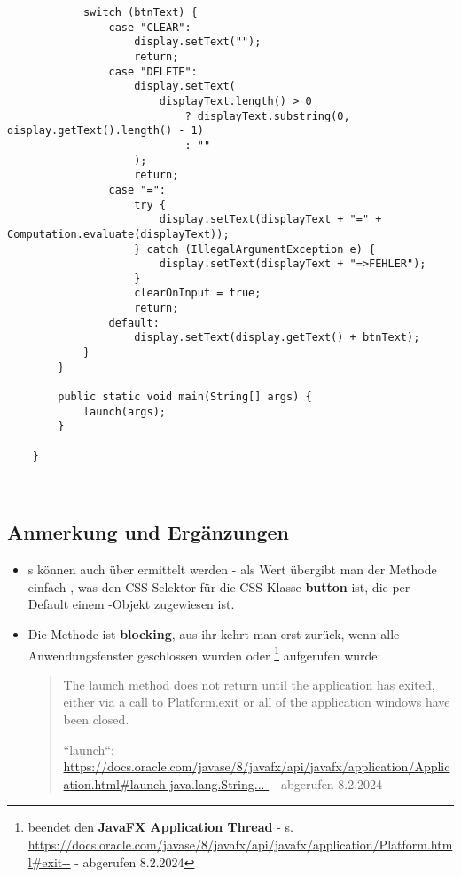 \begin{verbatim}
            switch (btnText) {
                case "CLEAR":
                    display.setText("");
                    return;
                case "DELETE":
                    display.setText(
                        displayText.length() > 0
                            ? displayText.substring(0, display.getText().length() - 1)
                            : ""
                    );
                    return;
                case "=":
                    try {
                        display.setText(displayText + "=" + Computation.evaluate(displayText));
                    } catch (IllegalArgumentException e) {
                        display.setText(displayText + "=>FEHLER");
                    }
                    clearOnInput = true;
                    return;
                default:
                    display.setText(display.getText() + btnText);
            }
        }

        public static void main(String[] args) {
            launch(args);
        }

    }
\end{verbatim}\\


\subsection{Anmerkung und Ergänzungen}


\begin{itemize}
    \item {}s können auch über  ermittelt werden - als Wert übergibt man der Methode einfach , was den CSS-Selektor für die CSS-Klasse \textbf{button} ist, die per Default einem -Objekt zugewiesen ist.
    \item Die Methode  ist \textbf{blocking}, aus ihr kehrt man erst zurück, wenn  alle Anwendungsfenster geschlossen wurden oder \footnote{
    beendet den \textbf{JavaFX Application Thread} - s. \url{https://docs.oracle.com/javase/8/javafx/api/javafx/application/Platform.html#exit--} - abgerufen 8.2.2024
    } aufgerufen wurde:
    \blockquote[{``launch``: \url{https://docs.oracle.com/javase/8/javafx/api/javafx/application/Application.html#launch-java.lang.String...-} - abgerufen 8.2.2024}]{
     The launch method does not return until the application has exited, either via a call to Platform.exit or all of the application windows have been closed.
    }
\end{itemize}
